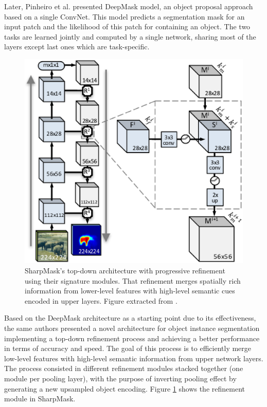 Later, Pinheiro et al. \cite{Pinheiro2015} presented DeepMask model, an object proposal approach based on a single ConvNet. This model predicts a segmentation mask for an input patch and the likelihood of this patch for containing an object. The two tasks are learned jointly and computed by a single network, sharing most of the layers except last ones which are task-specific. 

\begin{figure}[!hbt]
	\centering
	\includegraphics[width=0.75\linewidth]{Figures/Segmentation/sharpmaskmodule.eps}
	\caption{SharpMask's top-down architecture with progressive refinement using their signature modules. That refinement merges spatially rich information from lower-level features with high-level semantic cues encoded in upper layers. Figure extracted from \cite{Pinheiro2015}.}
	\label{fig:semseg:sharpmask-refinement-module}
\end{figure}

Based on the DeepMask architecture as a starting point due to its effectiveness, the same authors presented a novel architecture for object instance segmentation implementing a top-down refinement process \cite{Pinheiro2016} and achieving a better performance in terms of accuracy and speed. The goal of this process is to efficiently merge low-level features with high-level semantic information from upper network layers. The process consisted in different refinement modules stacked together (one module per pooling layer), with the purpose of inverting pooling effect by generating a new upsampled object encoding. Figure \ref{fig:semseg:sharpmask-refinement-module} shows the refinement module in SharpMask.

